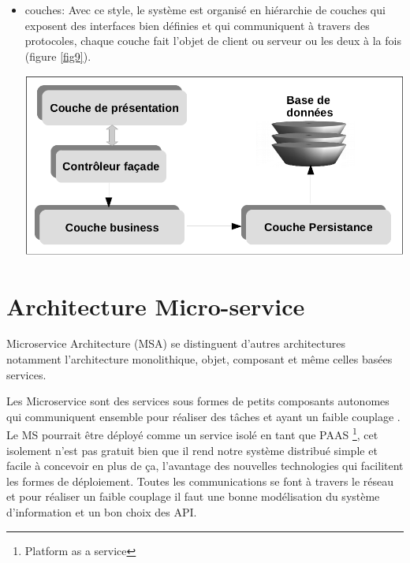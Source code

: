 \documentclass[12pt, a4paper, openany]{report}
\begin{document}
\begin{itemize}
      
      \item  couches: Avec ce style, le système est organisé en hiérarchie de couches qui exposent des interfaces bien définies et qui communiquent à travers des protocoles, chaque couche fait l'objet de client ou serveur ou les deux à la fois (figure \ref{fig9}).
             \begin{center}
               \includegraphics[scale=0.3]{style_couche_9.png}
               \label{fig9}
             \end{center}
             
  \end{itemize}
  
  
\chapter{Architecture Micro-service}
  Microservice Architecture (MSA) se distinguent d'autres architectures notamment l'architecture monolithique, objet, composant et même celles basées services.

    Les Microservice sont des services sous formes de petits composants autonomes qui communiquent ensemble pour réaliser des tâches et ayant un faible couplage \cite{refbibFowler} .  \\

    Le MS pourrait être déployé comme un service isolé en tant que PAAS \footnote{Platform as a service}, cet isolement n'est pas gratuit bien que il rend notre système distribué simple et facile à concevoir en plus de ça, l'avantage des nouvelles technologies qui facilitent les formes de déploiement. Toutes les communications se font à travers le réseau et pour réaliser un faible couplage il faut une bonne modélisation du système d'information et un bon choix des API.
  
\end{document}

